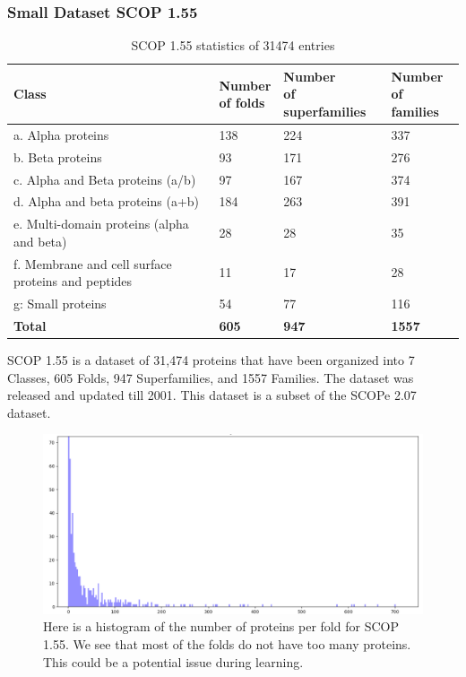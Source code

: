 \documentclass[12pt, a4paper, twocolumn, fullpage]{article}
\theoremstyle{plain}
\theoremstyle{definition}
\theoremstyle{remark}
\begin{document}
\subsubsection{Small Dataset SCOP 1.55}
\begin{table}[h]
    \centering
    \begin{tabular}{| l | l | l | l |}
        \hline 
        Class & \makecell{Number \\ of folds} & \makecell{Number  \\ of superfamilies} & \makecell{Number \\ of families} \\ \hline
        a. Alpha proteins & 138 & 224 & 337 \\ \hline
        b. Beta proteins & 93 & 171 & 276 \\ \hline
        c. Alpha and Beta proteins (a/b) & 97 & 167 & 374 \\ \hline
        d. Alpha and beta proteins (a+b) & 184 & 263 & 391 \\ \hline
        e. Multi-domain proteins (alpha and beta) & 28 & 28 & 35 \\ \hline
        \makecell[l]{f. Membrane and cell surface \\ proteins and peptides} & 11 & 17 & 28 \\ \hline
        g: Small proteins & 54 & 77 & 116 \\ \hline
        \textbf{Total} & \textbf{605} & \textbf{947} & \textbf{1557}  \\ \hline
        \hline
    \end{tabular}
    \caption{ SCOP 1.55 statistics of 31474 entries}
    \label{}
\end{table}

SCOP 1.55 is a dataset of 31,474 proteins that have been organized into 7 Classes, 605 Folds, 947 Superfamilies, and 1557 Families. The dataset was released and updated till 2001. This dataset is a subset of the SCOPe 2.07 dataset.


\begin{figure}
    \includegraphics[width=\linewidth]{num_proteins_fold_155}
    \caption{Here is a histogram of the number of proteins per fold for SCOP 1.55. We see that most of the folds do not have too many proteins. This could be a potential issue during learning.}
    \label{num_proteins_fold_155}
\end{figure}
\end{document}
